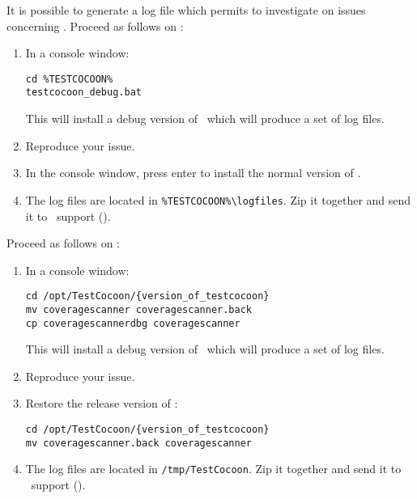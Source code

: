 
It is possible to generate a log file which permits to investigate on issues concerning \CoverageScanner. Proceed as follows on \MicrosoftWindows:
\begin{enumerate}
\item In a console window:
\begin{verbatim}
cd %TESTCOCOON%
testcocoon_debug.bat
\end{verbatim}

This will install a debug version of \CoverageScanner\ which will produce a set of log files.
\item Reproduce your issue.
\item In the console window, press enter to install the normal version of \CoverageScanner.
\item The log files are located in \verb$%TESTCOCOON%\logfiles$. Zip it together and send it to \TestCocoon\ support ().
\end{enumerate}

Proceed as follows on \Linux:
\begin{enumerate}
\item In a console window:
\begin{verbatim}
cd /opt/TestCocoon/{version_of_testcocoon}
mv coveragescanner coveragescanner.back
cp coveragescannerdbg coveragescanner
\end{verbatim}

This will install a debug version of \CoverageScanner\ which will produce a set of log files.
\item Reproduce your issue.
\item Restore the release version of \CoverageScanner:
\begin{verbatim}
cd /opt/TestCocoon/{version_of_testcocoon}
mv coveragescanner.back coveragescanner 
\end{verbatim}
\item The log files are located in \verb$/tmp/TestCocoon$. Zip it together and send it to \TestCocoon\ support ().
\end{enumerate}



